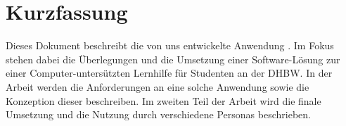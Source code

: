 \chapter*{Kurzfassung}

Dieses Dokument beschreibt die von uns entwickelte Anwendung \NameDerAnwendung.
Im Fokus stehen dabei die Überlegungen und die Umsetzung einer Software-Lösung zur einer Computer-untersützten Lernhilfe für Studenten an der DHBW. %
In der Arbeit werden die Anforderungen an eine solche Anwendung sowie die Konzeption dieser beschreiben.
Im zweiten Teil der Arbeit wird die finale Umsetzung und die Nutzung durch verschiedene Personas beschrieben.


